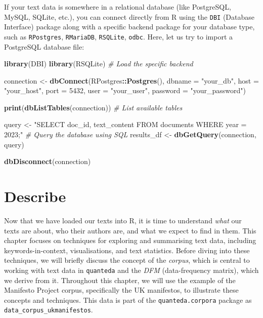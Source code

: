 \documentclass[
]{book}
\newenvironment{Shaded}{\begin{snugshade}}{\end{snugshade}}
\newcommand{\AttributeTok}[1]{\textcolor[rgb]{0.13,0.29,0.53}{#1}}
\newcommand{\CommentTok}[1]{\textcolor[rgb]{0.56,0.35,0.01}{\textit{#1}}}
\newcommand{\DecValTok}[1]{\textcolor[rgb]{0.00,0.00,0.81}{#1}}
\newcommand{\FunctionTok}[1]{\textcolor[rgb]{0.13,0.29,0.53}{\textbf{#1}}}
\newcommand{\NormalTok}[1]{#1}
\newcommand{\OtherTok}[1]{\textcolor[rgb]{0.56,0.35,0.01}{#1}}
\newcommand{\SpecialCharTok}[1]{\textcolor[rgb]{0.81,0.36,0.00}{\textbf{#1}}}
\newcommand{\StringTok}[1]{\textcolor[rgb]{0.31,0.60,0.02}{#1}}
\begin{document}
If your text data is somewhere in a relational database (like PostgreSQL, MySQL, SQLite, etc.), you can connect directly from R using the \texttt{DBI} (Database Interface) package along with a specific backend package for your database type, such as \texttt{RPostgres}, \texttt{RMariaDB}, \texttt{RSQLite}, \texttt{odbc}. Here, let us try to import a PostgreSQL database file:

\begin{Shaded}
\begin{Highlighting}[]
\FunctionTok{library}\NormalTok{(DBI)}
\FunctionTok{library}\NormalTok{(RSQLite)  }\CommentTok{\# Load the specific backend}

\NormalTok{connection }\OtherTok{\textless{}{-}} \FunctionTok{dbConnect}\NormalTok{(RPostgres}\SpecialCharTok{::}\FunctionTok{Postgres}\NormalTok{(), }\AttributeTok{dbname =} \StringTok{"your\_db"}\NormalTok{, }\AttributeTok{host =} \StringTok{"your\_host"}\NormalTok{,}
    \AttributeTok{port =} \DecValTok{5432}\NormalTok{, }\AttributeTok{user =} \StringTok{"your\_user"}\NormalTok{, }\AttributeTok{password =} \StringTok{"your\_password"}\NormalTok{)}

\FunctionTok{print}\NormalTok{(}\FunctionTok{dbListTables}\NormalTok{(connection))  }\CommentTok{\# List available tables}

\NormalTok{query }\OtherTok{\textless{}{-}} \StringTok{"SELECT doc\_id, text\_content FROM documents WHERE year = 2023;"}  \CommentTok{\# Query the database using SQL}
\NormalTok{results\_df }\OtherTok{\textless{}{-}} \FunctionTok{dbGetQuery}\NormalTok{(connection, query)}

\FunctionTok{dbDisconnect}\NormalTok{(connection)}
\end{Highlighting}
\end{Shaded}

\chapter{Describe}\label{describe}

Now that we have loaded our texts into R, it is time to understand \emph{what} our texts are about, who their authors are, and what we expect to find in them. This chapter focuses on techniques for exploring and summarising text data, including keywords-in-context, visualisations, and text statistics. Before diving into these techniques, we will briefly discuss the concept of the \emph{corpus}, which is central to working with text data in \texttt{quanteda} and the \emph{DFM} (data-frequency matrix), which we derive from it. Throughout this chapter, we will use the example of the Manifesto Project corpus, specifically the UK manifestos, to illustrate these concepts and techniques. This data is part of the \texttt{quanteda.corpora} package as \texttt{data\_corpus\_ukmanifestos}.
\end{document}
